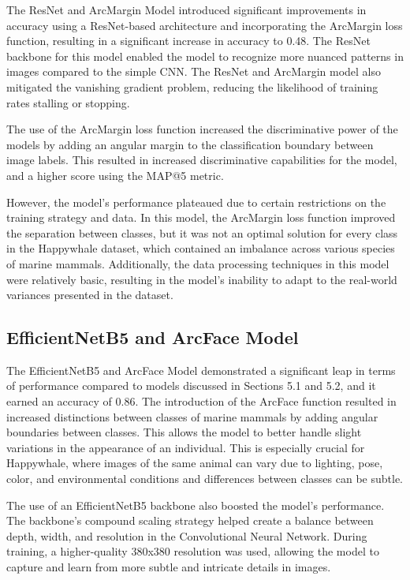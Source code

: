 \documentclass[twocolumn]{article}
\begin{document}
The ResNet and ArcMargin Model introduced significant improvements in accuracy using a ResNet-based architecture and incorporating the ArcMargin loss function, resulting in a significant increase in accuracy to 0.48. The ResNet backbone for this model enabled the model to recognize more nuanced patterns in images compared to the simple CNN. The ResNet and ArcMargin model also mitigated the vanishing gradient problem, reducing the likelihood of training rates stalling or stopping.

The use of the ArcMargin loss function increased the discriminative power of the models by adding an angular margin to the classification boundary between image labels. This resulted in increased discriminative capabilities for the model, and a higher score using the MAP@5 metric.

However, the model's performance plateaued due to certain restrictions on the training strategy and data. In this model, the ArcMargin loss function improved the separation between classes, but it was not an optimal solution for every class in the Happywhale dataset, which contained an imbalance across various species of marine mammals. Additionally, the data processing techniques in this model were relatively basic, resulting in the model's inability to adapt to the real-world variances presented in the dataset.

\subsection{EfficientNetB5 and ArcFace Model}

The EfficientNetB5 and ArcFace Model demonstrated a significant leap in terms of performance compared to models discussed in Sections 5.1 and 5.2, and it earned an accuracy of 0.86. The introduction of the ArcFace function resulted in increased distinctions between classes of marine mammals by adding angular boundaries between classes. This allows the model to better handle slight variations in the appearance of an individual. This is especially crucial for Happywhale, where images of the same animal can vary due to lighting, pose, color, and environmental conditions and differences between classes can be subtle.

The use of an EfficientNetB5 backbone also boosted the model's performance. The backbone's compound scaling strategy helped create a balance between depth, width, and resolution in the Convolutional Neural Network. During training, a higher-quality 380x380 resolution was used, allowing the model to capture and learn from more subtle and intricate details in images.
\end{document}
